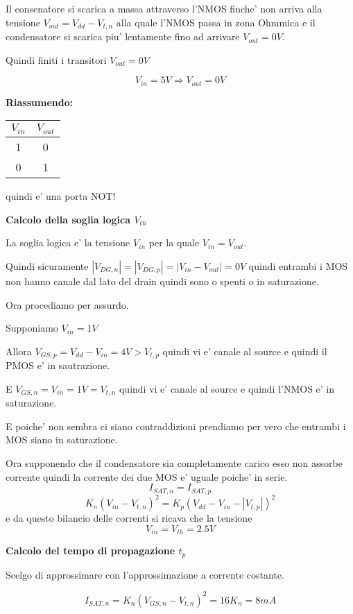 \documentclass[\main/main.tex]{subfiles}
\begin{document}
Il consenatore si scarica a massa attraverso l'NMOS finche' non arriva alla tensione $V_{out} = V_{dd} - V_{t,n}$ alla quale l'NMOS passa in zona Ohmmica e il condensatore si scarica piu' lentamente fino ad arrivare $V_{out} = 0V$.

Quindi finiti i transitori $V_{out} = 0V$

\[V_{in} = 5V \Rightarrow V_{out} = 0V\]

\textbf{Riassumendo:}
\begin{center}
    \begin{tabular}{ c | c }
        $V_{in}$ & $V_{out}$ \\
        \hline
        1        & 0         \\
        0        & 1         \\
    \end{tabular}
\end{center}
quindi e' una porta NOT!


\clearpage
\textbf{Calcolo della soglia logica $V_{th}$}

La soglia logica e' la tensione $V_{in}$ per la quale $V_{in} = V_{out}$.

Quindi sicuramente $|V_{DG,n}| = |V_{DG,p}| = |V_{in} - V_{out}| = 0V$ quindi entrambi i MOS non hanno canale dal lato del drain quindi sono o spenti o in saturazione.

Ora procediamo per assurdo.

Supponiamo $V_{in} = 1V$

Allora $V_{GS,p} = V_{dd} - V_{in} = 4V > V_{t,p}$ quindi vi e' canale al source e quindi il PMOS e' in sautrazione.

E $V_{GS,n} = V_{in} = 1V = V_{t,n}$ quindi vi e' canale al source e quindi l'NMOS e' in saturazione.

E poiche' non sembra ci siano contraddizioni prendiamo per vero che entrambi i MOS siano in saturazione.

Ora supponendo che il condensatore sia completamente carico esso non assorbe corrente quindi la corrente dei due MOS e' uguale poiche' in serie.
\[I_{SAT,n} = I_{SAT,p}\]
\[K_n \left(V_{in} - V_{t,n} \right )^2 = K_p \left(V_{dd} - V_{in} - |V_{t,p}| \right )^2\]
e da questo bilancio delle correnti si ricava che la tensione
\[V_{in} = V_{th} = 2.5V\]

\textbf{Calcolo del tempo di propagazione $t_p$}

Scelgo di approssimare con l'approssimazione a corrente costante.

\[I_{SAT,n} = K_n \left( V_{GS,n} - V_{t,n} \right)^2 = 16 K_n = 8mA\]
\end{document}
